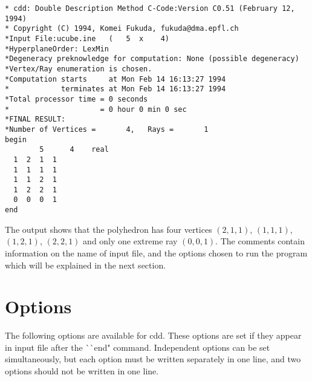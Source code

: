 \begin{verbatim}
* cdd: Double Description Method C-Code:Version C0.51 (February 12, 1994)
* Copyright (C) 1994, Komei Fukuda, fukuda@dma.epfl.ch
*Input File:ucube.ine   (   5  x    4)
*HyperplaneOrder: LexMin
*Degeneracy preknowledge for computation: None (possible degeneracy)
*Vertex/Ray enumeration is chosen.
*Computation starts     at Mon Feb 14 16:13:27 1994
*            terminates at Mon Feb 14 16:13:27 1994
*Total processor time = 0 seconds
*                     = 0 hour 0 min 0 sec
*FINAL RESULT:
*Number of Vertices =       4,   Rays =       1
begin
        5      4    real
  1  2  1  1
  1  1  1  1
  1  1  2  1
  1  2  2  1
  0  0  0  1
end
\end{verbatim}

The output shows that the polyhedron has four vertices
$(2,1,1)$, $(1,1,1)$, $(1,2,1)$, $(2,2,1)$ and
only one extreme ray $(0,0,1)$.  The comments contain
information on the name of input file, and the options
chosen to run the program which will be explained in
the next section.

\newpage
\section{Options}  \label{OPTIONS}

The following options are available for cdd.  These options are
set if they appear in input file after the ^^ ^^ end" command.
Independent options can be set simultaneously, but each option
must be written separately in one line, and  two options
should not be written in one line.

